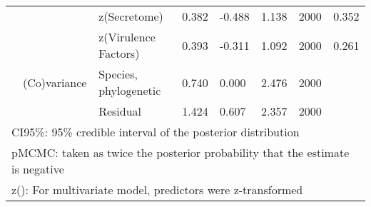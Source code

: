 \begin{table}
\begin{tabular}[t]{llllllll}
\hspace{1em} &  & z(Secretome) & 0.382 & -0.488 & 1.138 & 2000 & 0.352\\
\hspace{1em} &  & z(Virulence Factors) & 0.393 & -0.311 & 1.092 & 2000 & 0.261\\
\hspace{1em} & (Co)variance & Species, phylogenetic & 0.740 & 0.000 & 2.476 & 2000 & \\
\hspace{1em} &  & Residual & 1.424 & 0.607 & 2.357 & 2000 & \\
\bottomrule
\multicolumn{8}{l}{\rule{0pt}{1em}CI95\%: 95\% credible interval of the posterior distribution}\\
\multicolumn{8}{l}{\rule{0pt}{1em}pMCMC: taken as twice the posterior probability that the estimate is negative}\\
\multicolumn{8}{l}{\rule{0pt}{1em}z(): For multivariate model, predictors were z-transformed}\\
\end{tabular}
\end{table}
